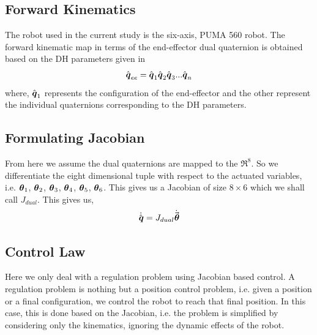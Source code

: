 \documentclass[a4paper,12pt]{article}
\begin{document}
\subsection{Forward Kinematics}
The robot used in the current study is the six-axis, PUMA 560 robot. The forward kinematic map in terms of the end-effector dual quaternion is obtained based on the DH parameters given in \cite{ghosal2006robotics}
\begin{align}
	\hat{\boldsymbol{q}}_{ee} = \hat{\boldsymbol{q}}_1\hat{\boldsymbol{q}}_2\hat{\boldsymbol{q}}_3...\hat{\boldsymbol{q}}_n
\end{align}
where, $\hat{\boldsymbol{q}}_1$ represents the configuration of the end-effector and the other represent the individual quaternions corresponding to the DH parameters. 
\subsection{Formulating Jacobian}
From here we assume the dual quaternions are mapped to the $\Re^8$. So we differentiate the eight dimensional tuple with respect to the actuated variables, i.e. $\boldsymbol{\theta}_1$, $\boldsymbol{\theta}_2$, $\boldsymbol{\theta}_3$, $\boldsymbol{\theta}_4$, $\boldsymbol{\theta}_5$, $\boldsymbol{\theta}_6$. This gives us a Jacobian of size $8\times6$ which we shall call $J_{dual}$. This gives us,
\begin{align}
	\dot{\hat{\boldsymbol{q}}} = J_{dual} \dot{\vec{\boldsymbol{\theta}}} \label{eqJ}
\end{align}
\subsection{Control Law} \label{controllaw}
Here we only deal with a regulation problem using Jacobian based control. A regulation problem is nothing but a position control problem, i.e. given a position or a final configuration, we control the robot to reach that final position. In this case, this is done based on the Jacobian, i.e. the problem is simplified by considering only the kinematics, ignoring the dynamic effects of the robot.
\end{document}
